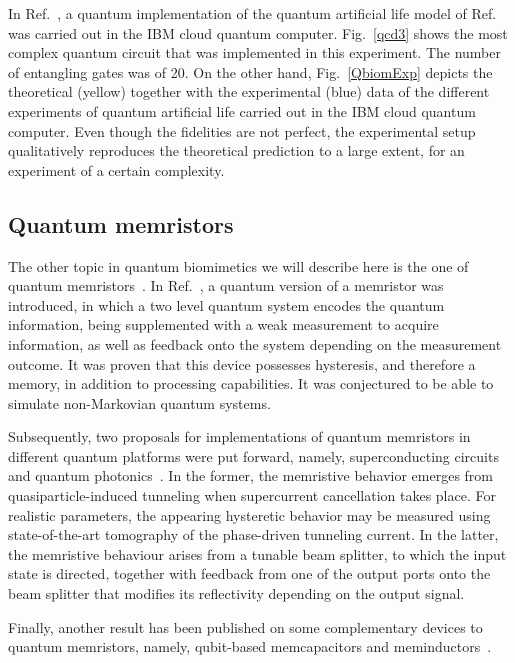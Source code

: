 \documentclass[12pt]{iopart}
\begin{document}
In Ref.~\cite{qubiom3}, a quantum implementation of the quantum artificial life model of Ref.~\cite{qubiom2} was carried out in the IBM cloud quantum computer. Fig.~\ref{qcd3} shows the most complex quantum circuit that was implemented in this experiment. The number of entangling gates was of 20. On the other hand, Fig.~\ref{QbiomExp} depicts the theoretical (yellow) together with the experimental (blue) data of the different experiments of quantum artificial life carried out in the IBM cloud quantum computer. Even though the fidelities are not perfect, the experimental setup qualitatively reproduces the theoretical prediction to a large extent, for an experiment of a certain complexity.





\subsection{Quantum memristors}

The other topic in quantum biomimetics we will describe here is the one of quantum memristors~\cite{qmem1,qmem2,qmem3,qmem4}. In Ref.~\cite{qmem1}, a quantum version of a memristor was introduced, in which a two level quantum system encodes the quantum information, being supplemented with a weak measurement to acquire information, as well as feedback onto the system depending on the measurement outcome. It was proven that this device possesses hysteresis, and therefore a memory, in addition to processing capabilities. It was conjectured to be able to simulate non-Markovian quantum systems.

Subsequently, two proposals for implementations of quantum memristors in different quantum platforms were put forward, namely, superconducting circuits~\cite{qmem2} and quantum photonics~\cite{qmem3}. In the former, the memristive behavior emerges from quasiparticle-induced tunneling when supercurrent cancellation takes place. For realistic parameters, the appearing hysteretic behavior may be measured using state-of-the-art tomography of the phase-driven tunneling current. In the latter, the memristive behaviour arises from a tunable beam splitter, to which the input state is directed, together with feedback from one of the output ports onto the beam splitter that modifies its reflectivity depending on the output signal.

Finally, another result has been published on some complementary devices to quantum memristors, namely, qubit-based memcapacitors and meminductors~\cite{qmem4}.
\end{document}
